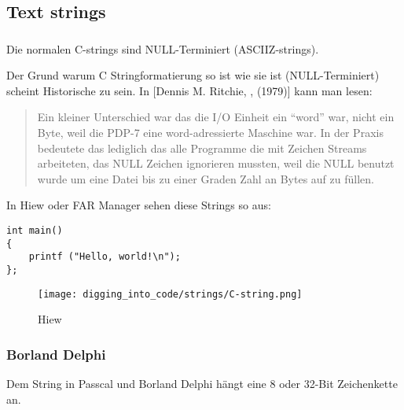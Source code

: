 \subsection{Text strings}

\subsubsection{\CCpp}

\label{C_strings}

Die normalen C-strings sind NULL-Terminiert (\ac{ASCIIZ}-strings).

Der Grund warum C Stringformatierung so ist wie sie ist (NULL-Terminiert) scheint Historische zu sein.
In [Dennis M. Ritchie, , (1979)] kann man lesen:

\begin{framed}
\begin{quotation}
Ein kleiner Unterschied war das die I/O Einheit ein ``word'' war, nicht ein Byte, weil die PDP-7 eine word-adressierte
Maschine war. In der Praxis bedeutete das lediglich das alle Programme die mit Zeichen Streams arbeiteten, das NULL 
Zeichen ignorieren mussten, weil die NULL benutzt wurde um eine Datei bis zu einer Graden Zahl an Bytes auf zu füllen.

\end{quotation}
\end{framed}


In Hiew oder FAR Manager sehen diese Strings so aus:

\begin{lstlisting}[style=customc]
int main()
{
	printf ("Hello, world!\n");
};
\end{lstlisting}

\begin{figure}[H]
\centering
\texttt{[image: digging\_into\_code/strings/C-string.png]}
\caption{Hiew}
\end{figure}


\subsubsection{Borland Delphi}

Dem String in Passcal und Borland Delphi hängt eine 8 oder 32-Bit Zeichenkette an. 

